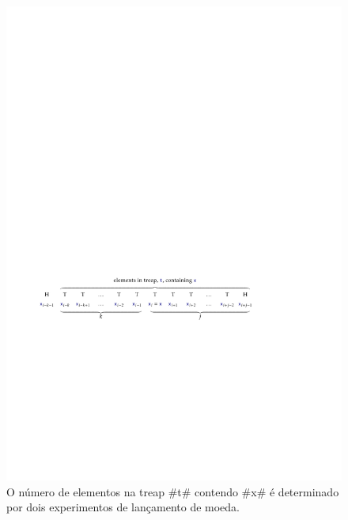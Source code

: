 \begin{figure}
  \begin{center}
    \includegraphics[width=\ScaleIfNeeded]{figs/yfast-sample}
  \end{center}
  \caption[O tempo de consulta em uma YFastTrie]{O número de elementos na treap #t# contendo #x# é determinado por dois experimentos de lançamento de moeda.}
\end{figure}

